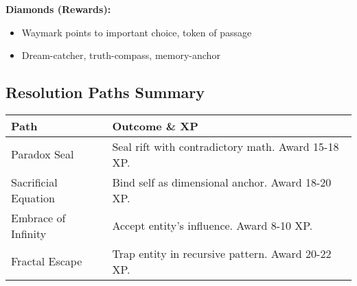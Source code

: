 \documentclass[11pt]{article}
\begin{document}
\textbf{Diamonds (Rewards):}
\begin{itemize}
\item Waymark points to important choice, token of passage
\item Dream-catcher, truth-compass, memory-anchor
\end{itemize}

\subsection*{Resolution Paths Summary}

\begin{tabular}{|p{4cm}|p{8cm}|}
\hline
\rowcolor{shadecolor}
\textbf{Path} & \textbf{Outcome \& XP} \\
\hline
Paradox Seal & Seal rift with contradictory math. Award 15-18 XP. \\
Sacrificial Equation & Bind self as dimensional anchor. Award 18-20 XP. \\
Embrace of Infinity & Accept entity's influence. Award 8-10 XP. \\
Fractal Escape & Trap entity in recursive pattern. Award 20-22 XP. \\
\hline
\end{tabular}
\end{document}

